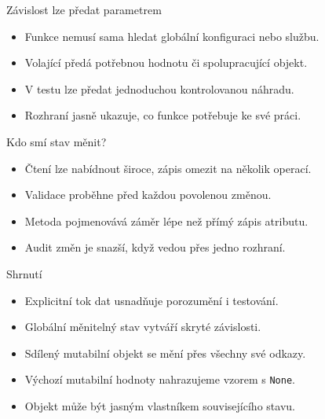 \documentclass[aspectratio=169]{beamer}
\begin{document}
\begin{frame}{Závislost lze předat parametrem}
\begin{itemize}
\item Funkce nemusí sama hledat globální konfiguraci nebo službu.
\item Volající předá potřebnou hodnotu či spolupracující objekt.
\item V testu lze předat jednoduchou kontrolovanou náhradu.
\item Rozhraní jasně ukazuje, co funkce potřebuje ke své práci.
\end{itemize}
\end{frame}

\begin{frame}{Kdo smí stav měnit?}
\begin{itemize}
\item Čtení lze nabídnout široce, zápis omezit na několik operací.
\item Validace proběhne před každou povolenou změnou.
\item Metoda pojmenovává záměr lépe než přímý zápis atributu.
\item Audit změn je snazší, když vedou přes jedno rozhraní.
\end{itemize}
\end{frame}

\begin{frame}{Shrnutí}
\begin{itemize}
\item Explicitní tok dat usnadňuje porozumění i testování.
\item Globální měnitelný stav vytváří skryté závislosti.
\item Sdílený mutabilní objekt se mění přes všechny své odkazy.
\item Výchozí mutabilní hodnoty nahrazujeme vzorem s \texttt{None}.
\item Objekt může být jasným vlastníkem souvisejícího stavu.
\end{itemize}
\end{frame}
\end{document}
